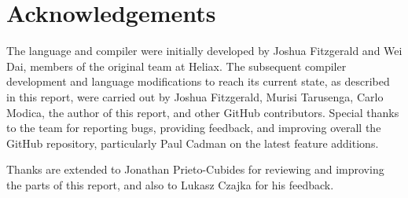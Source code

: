 \documentclass[
    9pt,            
    techreport,       
    affiltop,       
]{art}
\begin{document}
\section{Acknowledgements}

The \VampIR{} language and compiler were initially developed by Joshua Fitzgerald and Wei Dai, members of the original \VampIR{} team at Heliax. The subsequent compiler development and language modifications to reach its current state, as described in this report, were carried out by Joshua Fitzgerald, Murisi Tarusenga, Carlo Modica, the author of this report, and other GitHub contributors. Special thanks to the
\Juvix{} team for reporting bugs, providing feedback, and improving overall the GitHub repository, particularly Paul Cadman on the latest feature additions.

Thanks are extended to Jonathan Prieto-Cubides for reviewing and improving the parts of this report, and also to Lukasz Czajka for his feedback.


\end{document}
